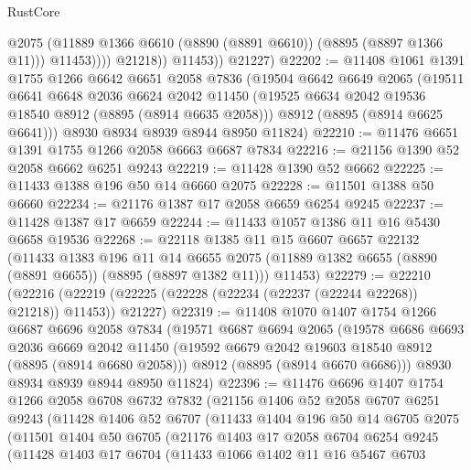 \begin{lexlean}{RustCore}
\begin{coremodule}
                      @2075
                      (@11889 @1366 @6610 (@8890 (@8891 @6610)) (@8895 (@8897 @1366 @11)))
                      @11453))))
              @21218))
          @11453))
      @21227)
@22202 := @11408
    @1061
    @1391
    @1755
    @1266
    @6642
    @6651
    @2058
    @7836
    (@19504
      @6642
      @6649
      @2065
      (@19511
        @6641
        @6648
        @2036
        @6624
        @2042
        @11450
        (@19525 @6634 @2042 @19536 @18540 @8912 (@8895 (@8914 @6635 @2058)))
        @8912
        (@8895 (@8914 @6625 @6641)))
      @8930
      @8934
      @8939
      @8944
      @8950
      @11824)
@22210 := @11476 @6651 @1391 @1755 @1266 @2058 @6663 @6687 @7834
@22216 := @21156 @1390 @52 @2058 @6662 @6251 @9243
@22219 := @11428 @1390 @52 @6662
@22225 := @11433 @1388 @196 @50 @14 @6660 @2075
@22228 := @11501 @1388 @50 @6660
@22234 := @21176 @1387 @17 @2058 @6659 @6254 @9245
@22237 := @11428 @1387 @17 @6659
@22244 := @11433 @1057 @1386 @11 @16 @5430 @6658 @19536
@22268 := @22118
    @1385
    @11
    @15
    @6607
    @6657
    @22132
    (@11433
      @1383
      @196
      @11
      @14
      @6655
      @2075
      (@11889 @1382 @6655 (@8890 (@8891 @6655)) (@8895 (@8897 @1382 @11)))
      @11453)
@22279 := @22210
    (@22216 (@22219 (@22225 (@22228 (@22234 (@22237 (@22244 @22268)) @21218)) @11453)) @21227)
@22319 := @11408
    @1070
    @1407
    @1754
    @1266
    @6687
    @6696
    @2058
    @7834
    (@19571
      @6687
      @6694
      @2065
      (@19578
        @6686
        @6693
        @2036
        @6669
        @2042
        @11450
        (@19592 @6679 @2042 @19603 @18540 @8912 (@8895 (@8914 @6680 @2058)))
        @8912
        (@8895 (@8914 @6670 @6686)))
      @8930
      @8934
      @8939
      @8944
      @8950
      @11824)
@22396 := @11476
    @6696
    @1407
    @1754
    @1266
    @2058
    @6708
    @6732
    @7832
    (@21156
      @1406
      @52
      @2058
      @6707
      @6251
      @9243
      (@11428
        @1406
        @52
        @6707
        (@11433
          @1404
          @196
          @50
          @14
          @6705
          @2075
          (@11501
            @1404
            @50
            @6705
            (@21176
              @1403
              @17
              @2058
              @6704
              @6254
              @9245
              (@11428
                @1403
                @17
                @6704
                (@11433
                  @1066
                  @1402
                  @11
                  @16
                  @5467
                  @6703

\end{coremodule}
\end{lexlean}
